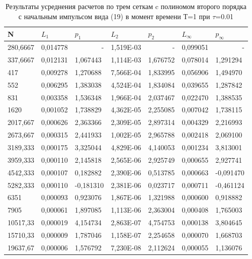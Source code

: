 \documentclass[14pt]{article}
\begin{document}
\begin{table}[H]
\caption{Результаты усреднения расчетов по трем сеткам c полиномом второго порядка с начальным импульсом вида (19) в момент времени Т=1 при $\tau$=0.01}
\begin{tabular}{|l|l|l|l|l|l|l|}
\hline
\multicolumn{1}{|l|}{N} & \multicolumn{1}{l|}{$L_1$}        & \multicolumn{1}{l|}{$p_1$} & \multicolumn{1}{l|}{$L_2$}     & \multicolumn{1}{l|}{$p_2$} & \multicolumn{1}{l|}{$L_\infty$} & \multicolumn{1}{l|}{$p_\infty$} \\ \hline
280,6667 & 0,014778 & \multicolumn{1}{r|}{-} & 1,519E-03 & \multicolumn{1}{r|}{-}        & 0,099051 & \multicolumn{1}{r|}{-} \\ \hline
337,6667 & 0,012131 & 1,067443               & 1,114E-03 & 1,676752 & 0,078014 & 1,291294               \\ \hline
417      & 0,009278 & 1,270688               & 7,566E-04 & 1,833995 & 0,056906 & 1,494970               \\ \hline
552      & 0,006295 & 1,383038               & 4,524E-04 & 1,834084 & 0,039655 & 1,287842               \\ \hline
831      & 0,003358 & 1,536348               & 1,966E-04 & 2,037467 & 0,022470 & 1,388535               \\ \hline
1620     & 0,001052 & 1,738829               & 4,362E-05 & 2,255085 & 0,007042 & 1,738115               \\ \hline
2017,667 & 0,000626 & 2,363366               & 2,309E-05 & 2,897314 & 0,004329 & 2,216993               \\ \hline
2673,667 & 0,000315 & 2,441933               & 1,002E-05 & 2,965788 & 0,002418 & 2,069100               \\ \hline
3189,333 & 0,000175 & 3,325044               & 4,829E-06 & 4,140053 & 0,001234 & 3,813001               \\ \hline
3959,333 & 0,000110 & 2,145818               & 2,565E-06 & 2,925749 & 0,000655 & 2,927741               \\ \hline
4542,333 & 0,000107 & 0,182882               & 2,390E-06 & 0,513785 & 0,000663 & -0,091470              \\ \hline
5282,333 & 0,000110 & -0,181310              & 2,381E-06 & 0,023717 & 0,000711 & -0,461124              \\ \hline
6351     & 0,000093 & 0,923076               & 1,867E-06 & 1,321988 & 0,000600 & 0,918882               \\ \hline
7905     & 0,000061 & 1,897085               & 1,113E-06 & 2,363004 & 0,000408 & 1,765003               \\ \hline
10517,33 & 0,000019 & 4,154734               & 2,863E-07 & 4,754753 & 0,000138 & 3,804645               \\ \hline
15710,33 & 0,000009 & 1,787046               & 1,158E-07 & 2,254658 & 0,000070 & 1,668703               \\ \hline
19637,67 & 0,000006 & 1,576792               & 7,230E-08 & 2,112624 & 0,000055 & 1,136076               \\ \hline
\end{tabular}

\end{table}
\end{document}

